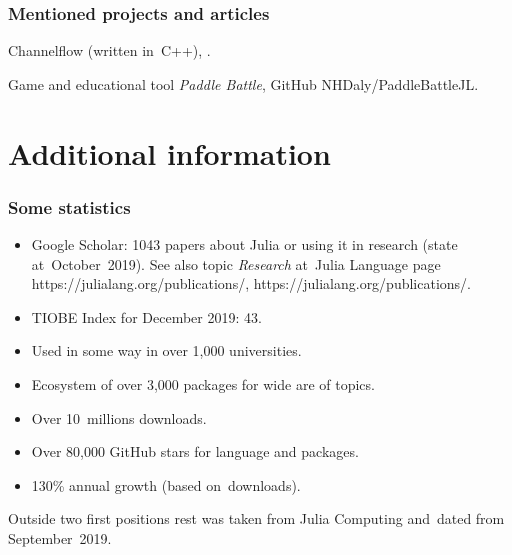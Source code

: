 \documentclass[10pt,t]{beamer}
\begin{document}
\begin{frame}
  \frametitle{Mentioned projects and articles}


  Channelflow (written in~C++),
  .

  \vspace{0.3em}



  Game and educational tool \textit{Paddle Battle}, GitHub
  {NHDaly/PaddleBattleJL}.

\end{frame}










\section{Additional information}



\begin{frame}
  \frametitle{Some statistics}


  \begin{itemize}
    \RaggedRight

  \item Google Scholar: 1043 papers about Julia or using it in research
    (state at~October~2019). See also topic \emph{Research}
    at~Julia Language page https://julialang.org/publications/,
    {https://julialang.org/publications/}.

  \item TIOBE Index for December 2019: 43.

  \item Used in some way in over 1,000 universities.

  \item Ecosystem of over 3,000 packages for wide are of topics.

  \item Over 10~millions downloads.

  \item Over 80,000 GitHub stars for language and packages.

  \item 130\% annual growth (based on~downloads).

  \end{itemize}
  Outside two first positions rest was taken from Julia
  Computing and~dated from September~2019.

\end{frame}
\end{document}
